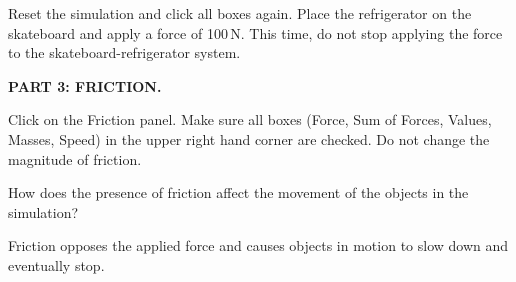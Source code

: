 \documentclass[]{exam}
\begin{document}
\begin{questions}
\question
Reset the simulation and click all boxes again. Place the refrigerator on the skateboard and apply a force of 100\,N. This time, do not stop applying the force to the skateboard-refrigerator system. 


\begin{EnvUplevel}
    \textbf{PART 3: FRICTION.}

    Click on the Friction panel. Make sure all boxes (Force, Sum of Forces, Values, Masses, Speed) in the upper right hand corner are checked. Do not change the magnitude of friction.
\end{EnvUplevel}

\question
How does the presence of friction affect the movement of the objects in the simulation?

\begin{solution}
    Friction opposes the applied force and causes objects in motion to slow down and eventually stop.
\end{solution}


\end{questions}
\end{document}
